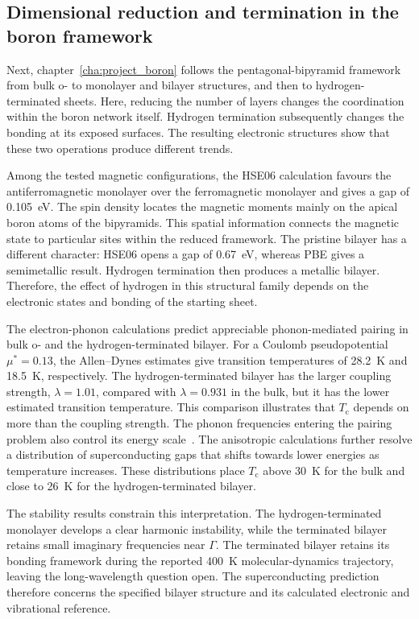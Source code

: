 \subsection{Dimensional reduction and termination in the boron framework}

Next, chapter~\ref{cha:project_boron} follows the pentagonal-bipyramid framework from bulk o- to monolayer and bilayer structures, and then to hydrogen-terminated sheets.
Here, reducing the number of layers changes the coordination within the boron network itself.
Hydrogen termination subsequently changes the bonding at its exposed surfaces.
The resulting electronic structures show that these two operations produce different trends.

Among the tested magnetic configurations, the HSE06 calculation favours the antiferromagnetic monolayer over the ferromagnetic monolayer and gives a gap of \qty{0.105}{\electronvolt}.
The spin density locates the magnetic moments mainly on the apical boron atoms of the bipyramids.
This spatial information connects the magnetic state to particular sites within the reduced framework.
The pristine bilayer has a different character: HSE06 opens a gap of \qty{0.67}{\electronvolt}, whereas PBE gives a semimetallic result.
Hydrogen termination then produces a metallic bilayer.
Therefore, the effect of hydrogen in this structural family depends on the electronic states and bonding of the starting sheet.

The electron-phonon calculations predict appreciable phonon-mediated pairing in bulk o- and the hydrogen-terminated bilayer.
For a Coulomb pseudopotential $\mu^*=0.13$, the Allen--Dynes estimates give transition temperatures of \qty{28.2}{\kelvin} and \qty{18.5}{\kelvin}, respectively.
The hydrogen-terminated bilayer has the larger coupling strength, $\lambda=1.01$, compared with $\lambda=0.931$ in the bulk, but it has the lower estimated transition temperature.
This comparison illustrates that $T_{\mathrm{c}}$ depends on more than the coupling strength.
The phonon frequencies entering the pairing problem also control its energy scale~\cite{allen-dynes}.
The anisotropic calculations further resolve a distribution of superconducting gaps that shifts towards lower energies as temperature increases.
These distributions place $T_{\mathrm{c}}$ above \qty{30}{\kelvin} for the bulk and close to \qty{26}{\kelvin} for the hydrogen-terminated bilayer.

The stability results constrain this interpretation.
The hydrogen-terminated monolayer develops a clear harmonic instability, while the terminated bilayer retains small imaginary frequencies near $\Gamma$.
The terminated bilayer retains its bonding framework during the reported \qty{400}{\kelvin} molecular-dynamics trajectory, leaving the long-wavelength question open.
The superconducting prediction therefore concerns the specified bilayer structure and its calculated electronic and vibrational reference.

